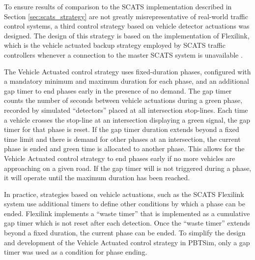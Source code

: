 To ensure results of comparison to the SCATS implementation described in Section \ref{sec:scats_strategy} are not greatly misrepresentative of real-world traffic control systems, a third control strategy based on vehicle detector actuations was designed. The design of this strategy is based on the implementation of Flexilink, which is the vehicle actuated backup strategy employed by SCATS traffic controllers whenever a connection to the master SCATS system is unavailable \cite{scatstraining}.

The Vehicle Actuated control strategy uses fixed-duration phases, configured with a mandatory minimum and maximum duration for each phase, and an additional gap timer to end phases early in the presence of no demand. The gap timer counts the number of seconds between vehicle actuations during a green phase, recorded by simulated ``detectors'' placed at all intersection stop-lines. Each time a vehicle crosses the stop-line at an intersection displaying a green signal, the gap timer for that phase is reset. If the gap timer duration extends beyond a fixed time limit and there is demand for other phases at an intersection, the current phase is ended and green time is allocated to another phase. This allows for the Vehicle Actuated control strategy to end phases early if no more vehicles are approaching on a given road. If the gap timer will is not triggered during a phase, it will operate until the maximum duration has been reached.

In practice, strategies based on vehicle actuations, such as the SCATS Flexilink system use additional timers to define other conditions by which a phase can be ended. Flexilink implements a ``waste timer'' that is implemented as a cumulative gap timer which is not reset after each detection. Once the ``waste timer'' extends beyond a fixed duration, the current phase can be ended. To simplify the design and development of the Vehicle Actuated control strategy in PBTSim, only a gap timer was used as a condition for phase ending.  


